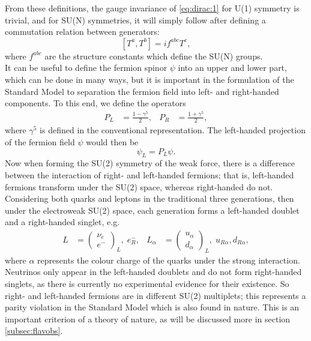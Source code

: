 \documentclass[a4paper,12pt]{article}
\begin{document}
From these definitions, the gauge invariance of \eqref{eq:dirac:1} for U(1) symmetry is trivial, and for SU(N) symmetries, it will simply follow after defining a commutation relation between generators:
\begin{equation}
    \label{eq:commute}
    [T^a,T^b] = if^{abc}T^c,
\end{equation}
where $f^{abc}$ are the structure constants which define the SU(N) groups. \\
It can be useful to define the fermion spinor $\psi$ into an upper and lower part, which can be done in many ways, but it is important in the formulation of the Standard Model to separation the fermion field into left- and right-handed components. 
To this end, we define the operators
\begin{align}
    \label{eq:helix}
    P_L &= \frac{1-\gamma^5}{2}, & P_R &= \frac{1+\gamma^5}{2},
\end{align}
where $\gamma^5$ is defined in the conventional representation. 
The left-handed projection of the fermion field $\psi$ would then be
\begin{equation}
    \label{eq:projection}
    \psi_L = P_L\psi.
\end{equation}
Now when forming the SU(2) symmetry of the weak force, there is a difference between the interaction of right- and left-handed fermions; that is, left-handed fermions transform under the SU(2) space, whereas right-handed do not.
Considering both quarks and leptons in the traditional three generations, then under the electroweak SU(2) space, each generation forms a left-handed doublet and a right-handed singlet, e.g.
\begin{align}
    \label{eq:doublet}
    L&=\begin{pmatrix} \nu_e \\ e^- \end{pmatrix}_L,\; e_R^-, & L_\alpha &=\begin{pmatrix} u_\alpha \\ d_\alpha\end{pmatrix}_L,\; u_{R\alpha},d_{R\alpha},
\end{align}
where $\alpha$ represents the colour charge of the quarks under the strong interaction.
Neutrinos only appear in the left-handed doublets and do not form right-handed singlets, as there is currently no experimental evidence for their existence.
So right- and left-handed fermions are in different SU(2) multiplets; this represents a parity violation in the Standard Model which is also found in nature. 
This is an important criterion of a theory of nature, as will be discussed more in section \ref{subsec:flavobs}.
\end{document}
